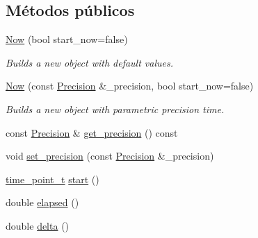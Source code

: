 \subsection*{Métodos públicos}
\begin{DoxyCompactItemize}
\item 
\hyperlink{class_designar_1_1_now_ad96b225953507a5a7853aef2c6b30641}{Now} (bool start\+\_\+now=false)
\begin{DoxyCompactList}\small\item\em Builds a new object with default values. \end{DoxyCompactList}\item 
\hyperlink{class_designar_1_1_now_ac98ba684b09b3ed28d8a615d59c01aa2}{Now} (const \hyperlink{class_designar_1_1_now_a3c9f5e57907c88cbe63c70a64638c072}{Precision} \&\+\_\+precision, bool start\+\_\+now=false)
\begin{DoxyCompactList}\small\item\em Builds a new object with parametric precision time. \end{DoxyCompactList}\item 
const \hyperlink{class_designar_1_1_now_a3c9f5e57907c88cbe63c70a64638c072}{Precision} \& \hyperlink{class_designar_1_1_now_a5f1a92bbd3bc6777749a0794d42b67c6}{get\+\_\+precision} () const
\item 
void \hyperlink{class_designar_1_1_now_aab4958d10eb970d40f3dcdf78a5f42e3}{set\+\_\+precision} (const \hyperlink{class_designar_1_1_now_a3c9f5e57907c88cbe63c70a64638c072}{Precision} \&\+\_\+precision)
\item 
\hyperlink{namespace_designar_a0edbd598eadb672df2c70e5af4dfccee}{time\+\_\+point\+\_\+t} \hyperlink{class_designar_1_1_now_a7ccb419799b46b7786b9ad0ac231de14}{start} ()
\item 
double \hyperlink{class_designar_1_1_now_a3219d85172fc9628ef90f66c1d69a8e0}{elapsed} ()
\item 
double \hyperlink{class_designar_1_1_now_ae2a46a7ff8392fbadc9fb28ee17f7f5a}{delta} ()
\end{DoxyCompactItemize}
